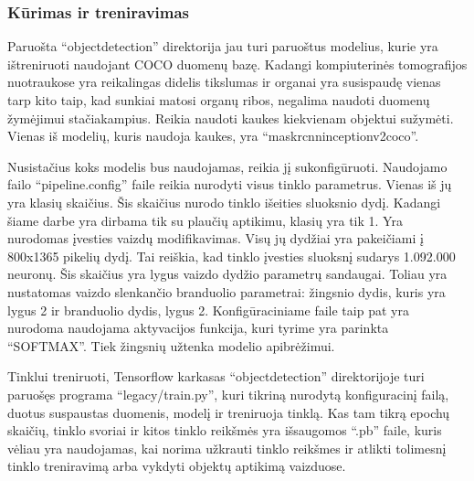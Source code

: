 \documentclass{VUMIFInfKursinis}
\begin{document}
\subsubsection{Kūrimas ir treniravimas}
\par
Paruošta \enquote{object\textunderscore detection} direktorija jau turi paruoštus
modelius, kurie yra ištreniruoti naudojant COCO duomenų bazę.
Kadangi kompiuterinės tomografijos nuotraukose yra reikalingas
didelis tikslumas ir organai yra susispaudę vienas tarp kito taip, kad
sunkiai matosi organų ribos, negalima naudoti duomenų žymėjimui stačiakampius.
Reikia naudoti kaukes kiekvienam objektui sužymėti. Vienas iš modelių, kuris naudoja
kaukes, yra \enquote{mask\textunderscore rcnn\textunderscore inception\textunderscore v2\textunderscore coco}.
\par
Nusistačius koks modelis bus naudojamas, reikia jį sukonfigūruoti.
Naudojamo failo \enquote{pipeline.config} faile reikia nurodyti visus tinklo parametrus.
Vienas iš jų yra klasių skaičius. Šis skaičius nurodo tinklo išeities sluoksnio dydį.
Kadangi šiame darbe yra dirbama tik su plaučių aptikimu, klasių yra tik 1.
Yra nurodomas įvesties vaizdų modifikavimas. Visų jų dydžiai yra pakeičiami į
800x1365 pikelių dydį. Tai reiškia, kad tinklo įvesties sluoksnį sudarys
1.092.000 neuronų. Šis skaičius yra lygus vaizdo dydžio parametrų sandaugai.
Toliau yra nustatomas vaizdo slenkančio branduolio parametrai: žingsnio dydis, kuris yra lygus 2 ir
branduolio dydis, lygus 2. Konfigūraciniame faile taip pat yra nurodoma naudojama
aktyvacijos funkcija, kuri tyrime yra parinkta \enquote{SOFTMAX}.
Tiek žingsnių užtenka modelio apibrėžimui.
\par
Tinklui treniruoti, Tensorflow karkasas \enquote{object\textunderscore detection} direktorijoje
turi paruošęs programa \enquote{legacy/train.py}, kuri tikriną nurodytą
konfiguracinį failą, duotus suspaustas duomenis, modelį ir treniruoja tinklą.
Kas tam tikrą epochų skaičių, tinklo svoriai ir kitos tinklo reikšmės
yra išsaugomos \enquote{.pb} faile, kuris vėliau yra naudojamas, kai norima
užkrauti tinklo reikšmes ir atlikti tolimesnį tinklo treniravimą arba vykdyti
objektų aptikimą vaizduose.
\end{document}
